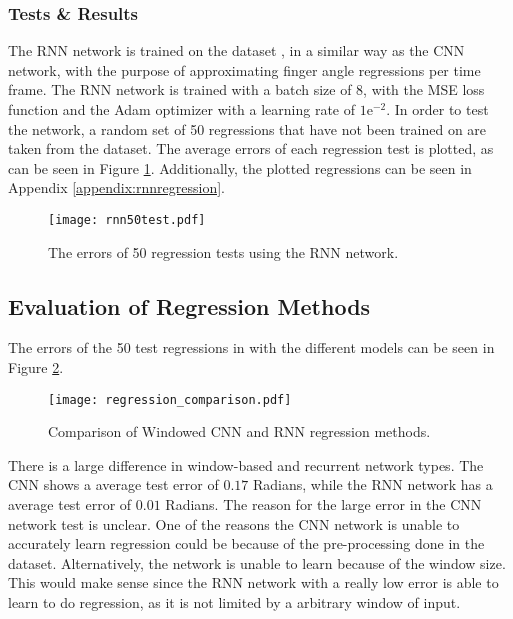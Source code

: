 \documentclass[../main.tex]{subfiles}
\begin{document}
\subsubsection{Tests \& Results}

The RNN network is trained on the dataset \cite{kinmusdataset}, in a similar way as the CNN network, with the purpose of approximating finger angle regressions per time frame.
The RNN network is trained with a batch size of 8, with the  MSE loss function and the Adam optimizer with a learning rate of $1\text{e}^{-2}$.
In order to test the network, a random set of 50 regressions that have not been trained on are taken from the dataset.
The average errors of each regression test is plotted, as can be seen in Figure \ref{fig:rnntest}.
Additionally, the plotted regressions can be seen in Appendix \ref{appendix:rnnregression}.

\begin{figure}[H]
\begin{center}
\texttt{[image: rnn50test.pdf]}
\caption{The errors of 50 regression tests using the RNN network.}
\label{fig:rnntest}
\end{center}
\end{figure}

\newpage
\subsection{Evaluation of Regression Methods}

The errors of the 50 test regressions in with the different models can be seen in Figure \ref{fig:regression_comp}.

\begin{figure}[h]
\begin{center}
\texttt{[image: regression\_comparison.pdf]}
\caption{Comparison of Windowed CNN and RNN regression methods.}
\label{fig:regression_comp}
\end{center}
\end{figure}

There is a large difference in window-based and recurrent network types.
The CNN shows a average test error of $0.17$ Radians, while the RNN network has a average test error of $0.01$ Radians. 
The reason for the large error in the CNN network test is unclear.
One of the reasons the CNN network is unable to accurately learn regression could be because of the pre-processing done in the dataset.
Alternatively, the network is unable to learn because of the window size. This would make sense since the RNN network with a really low error is able to learn to do regression, as it is not limited by a arbitrary window of input.
\end{document}
